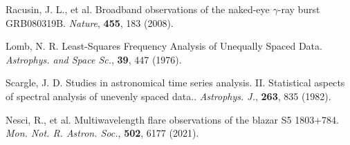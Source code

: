 \documentclass{nature_plusfigure}
\newcommand{\mn}{{Mon. Not. R. Astron. Soc.}}
\newcommand{\mnras}{\mn}
\newcommand{\apj}{{Astrophys. J.}}
\newcommand{\apss}{{Astrophys. and Space Sc.}}
\newcommand{\nat}{{Nature}}
\begin{document}
\begin{methods}
\begin{thebibliography}{10}
 Racusin, J. L., et al. Broadband observations of the naked-eye $\gamma$-ray burst GRB080319B. \emph{\nat}, \textbf{455}, 183 (2008). 

 Lomb, N. R. Least-Squares Frequency Analysis of Unequally Spaced Data. \emph{\apss}, \textbf{39}, 447 (1976). 

 Scargle, J. D. Studies in astronomical time series analysis. II. Statistical aspects of spectral analysis of unevenly spaced data.. \emph{\apj}, \textbf{263}, 835 (1982). 

 Nesci, R., et al. Multiwavelength flare observations of the blazar S5 1803+784. \emph{\mnras}, \textbf{502}, 6177 (2021). 


\end{thebibliography}

\end{methods}

\clearpage
\end{document}
